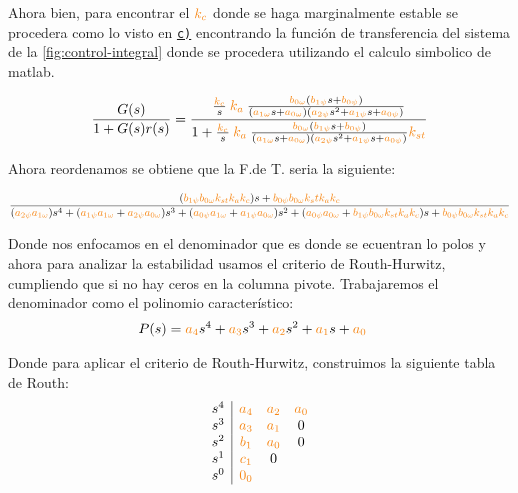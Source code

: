 Ahora bien,  para encontrar el $\nara{k_c}$ donde se haga marginalmente estable se procedera como lo visto en \hyperref[pregunta-c]{\texttt{c)}} encontrando la función de transferencia del sistema de la \autoref{fig:control-integral} donde se procedera utilizando el calculo simbolico de matlab. 

\begin{equation}
  \frac{G(s)}{1 + G(s)r(s)} = \dfrac{\frac{\nara{k_c}}{s}\nara{k_a} \frac{\nara{\nara{b_{0\omega}}}\left(\nara{b_{1\psi}}s + \nara{b_{0\psi}}\right)}
  {\left(\nara{a_{1\omega}}s + \nara{a_{0\omega}}\right)\left(\nara{a_{2\psi}}s^{2} + \nara{a_{1\psi}}s + \nara{a_{0\psi}}\right)}}
  {1+\frac{\nara{k_c}}{s} \nara{k_a} \frac{\nara{\nara{b_{0\omega}}}\left(\nara{b_{1\psi}}s + \nara{b_{0\psi}}\right)}
  {\left(\nara{a_{1\omega}}s + \nara{a_{0\omega}}\right)\left(\nara{a_{2\psi}}s^{2} + \nara{a_{1\psi}}s + \nara{a_{0\psi}}\right)}\nara{k_{st}}}
\end{equation}

Ahora reordenamos se obtiene que la F.de T. seria la siguiente:


\begin{equation}
  \dfrac{(\nara{b_{1\psi} b_{0\omega} k_{st} k_a k_c})s + \nara{b_{0\psi} b_{0\omega}k_st k_a k_c}}
  {(\nara{a_{2\psi} a_{1\omega}}) s^4 +
  (\nara{a_{1\psi} a_{1\omega}} + \nara{a_{2\psi} a_{0\omega}}) s^3 + 
  (\nara{a_{0\psi} a_{1\omega}} + \nara{a_{1\psi} a_{0\omega}}) s^2 + 
  (\nara{a_{0\psi} a_{0\omega}} + \nara{b_{1\psi} b_{0\omega}k_{st} k_a k_c})s+ 
  \nara{b_{0\psi} b_{0\omega} k_{st} k_a k_c}}
\end{equation}

Donde nos enfocamos en el denominador que es donde se ecuentran lo polos y ahora para analizar la estabilidad usamos el criterio de Routh-Hurwitz, cumpliendo que si no hay ceros en la columna pivote. Trabajaremos el denominador como el polinomio característico:
\begin{align}
    P(s) = \nara{a_4} s^4 + \nara{a_3} s^3 + \nara{a_2} s^2 + \nara{a_1} s + \nara{a_0} &
\end{align}

Donde para aplicar el criterio de Routh-Hurwitz, construimos la siguiente tabla de Routh:
\[
\begin{array}{c|ccc}
s^4 & \nara{a_4} & \nara{a_2} & \nara{a_0} \\
s^3 & \nara{a_3} & \nara{a_1} & 0\\
s^2 & \nara{b_1} & \nara{a_0} & 0\\
s^1 & \nara{c_1} & 0 \\
s^0 & \nara{0_0} & 
\end{array}
\]



